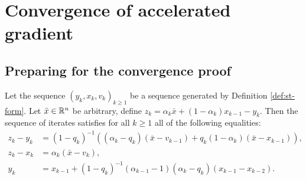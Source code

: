 \documentclass[12pt]{article}
\begin{document}
\section{Convergence of accelerated gradient}
    \subsection{Preparing for the convergence proof}
        \begin{lemma}\label{lemma:cnvg-prep-part1}
            Let the sequence $(y_k, x_k, v_k)_{k \ge 1}$ be a sequence generated by Definition \ref{def:st-form}. 
            Let $\bar x \in \mathbb R^n$ be arbitrary, define $z_k = \alpha_k \bar x + (1 - \alpha_k)x_{k - 1} - y_k$. 
            Then the sequence of iterates satisfies for all $k \ge 1$ all of the following equalities: 
            \begin{align*}
                z_k - y_k &= (1 - q_k)^{-1}\left(
                    (\alpha_k - q_k)(\bar x - v_{k - 1}) + q_k(1 - \alpha_k)(\bar x - x_{k - 1})
                \right), 
                \\
                z_k - x_k &= \alpha_k (\bar x - v_k), 
                \\
                y_k &= x_{k -1} + (1 - q_k)^{-1}(\alpha_{k - 1} - 1)(\alpha_k - q_k)(x_{k - 1} - x_{k - 2}). 
            \end{align*}
        \end{lemma}
\end{document}
